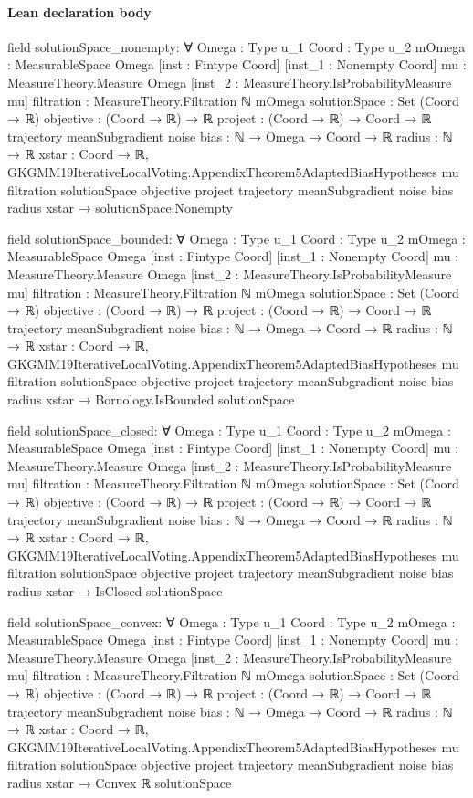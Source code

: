 \documentclass[10pt]{article}
\begin{document}
\paragraph{Lean declaration body}
\begin{ReviewVerbatim}
field solutionSpace_nonempty:
∀ {Omega : Type u_1} {Coord : Type u_2} {mOmega : MeasurableSpace Omega} [inst : Fintype Coord]
  [inst_1 : Nonempty Coord] {mu : MeasureTheory.Measure Omega} [inst_2 : MeasureTheory.IsProbabilityMeasure mu]
  {filtration : MeasureTheory.Filtration ℕ mOmega} {solutionSpace : Set (Coord → ℝ)} {objective : (Coord → ℝ) → ℝ}
  {project : (Coord → ℝ) → Coord → ℝ} {trajectory meanSubgradient noise bias : ℕ → Omega → Coord → ℝ} {radius : ℕ → ℝ}
  {xstar : Coord → ℝ},
  GKGMM19IterativeLocalVoting.AppendixTheorem5AdaptedBiasHypotheses mu filtration solutionSpace objective project
      trajectory meanSubgradient noise bias radius xstar →
    solutionSpace.Nonempty

field solutionSpace_bounded:
∀ {Omega : Type u_1} {Coord : Type u_2} {mOmega : MeasurableSpace Omega} [inst : Fintype Coord]
  [inst_1 : Nonempty Coord] {mu : MeasureTheory.Measure Omega} [inst_2 : MeasureTheory.IsProbabilityMeasure mu]
  {filtration : MeasureTheory.Filtration ℕ mOmega} {solutionSpace : Set (Coord → ℝ)} {objective : (Coord → ℝ) → ℝ}
  {project : (Coord → ℝ) → Coord → ℝ} {trajectory meanSubgradient noise bias : ℕ → Omega → Coord → ℝ} {radius : ℕ → ℝ}
  {xstar : Coord → ℝ},
  GKGMM19IterativeLocalVoting.AppendixTheorem5AdaptedBiasHypotheses mu filtration solutionSpace objective project
      trajectory meanSubgradient noise bias radius xstar →
    Bornology.IsBounded solutionSpace

field solutionSpace_closed:
∀ {Omega : Type u_1} {Coord : Type u_2} {mOmega : MeasurableSpace Omega} [inst : Fintype Coord]
  [inst_1 : Nonempty Coord] {mu : MeasureTheory.Measure Omega} [inst_2 : MeasureTheory.IsProbabilityMeasure mu]
  {filtration : MeasureTheory.Filtration ℕ mOmega} {solutionSpace : Set (Coord → ℝ)} {objective : (Coord → ℝ) → ℝ}
  {project : (Coord → ℝ) → Coord → ℝ} {trajectory meanSubgradient noise bias : ℕ → Omega → Coord → ℝ} {radius : ℕ → ℝ}
  {xstar : Coord → ℝ},
  GKGMM19IterativeLocalVoting.AppendixTheorem5AdaptedBiasHypotheses mu filtration solutionSpace objective project
      trajectory meanSubgradient noise bias radius xstar →
    IsClosed solutionSpace

field solutionSpace_convex:
∀ {Omega : Type u_1} {Coord : Type u_2} {mOmega : MeasurableSpace Omega} [inst : Fintype Coord]
  [inst_1 : Nonempty Coord] {mu : MeasureTheory.Measure Omega} [inst_2 : MeasureTheory.IsProbabilityMeasure mu]
  {filtration : MeasureTheory.Filtration ℕ mOmega} {solutionSpace : Set (Coord → ℝ)} {objective : (Coord → ℝ) → ℝ}
  {project : (Coord → ℝ) → Coord → ℝ} {trajectory meanSubgradient noise bias : ℕ → Omega → Coord → ℝ} {radius : ℕ → ℝ}
  {xstar : Coord → ℝ},
  GKGMM19IterativeLocalVoting.AppendixTheorem5AdaptedBiasHypotheses mu filtration solutionSpace objective project
      trajectory meanSubgradient noise bias radius xstar →
    Convex ℝ solutionSpace


\end{ReviewVerbatim}
\end{document}
